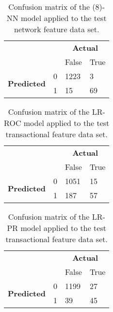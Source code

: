 \begin{table}
\centering
\begin{tabular}{llll}
                                                        &   & \multicolumn{2}{c}{\textbf{Actual}} \\
                                                        &   & False             & True            \\ \hline
\multicolumn{1}{c}{\multirow{2}{*}{\textbf{Predicted}}} & 0 & 1223              & 3               \\
\multicolumn{1}{c}{}                                    & 1 & 15                & 69              \\ \hline
\end{tabular}
\caption{Confusion matrix of the (8)-NN model applied to the test network feature data set.}
\label{tab:ch3_cm_nn_network}
\end{table}

\begin{table}
\centering
\begin{tabular}{llll}
                                                        &   & \multicolumn{2}{c}{\textbf{Actual}} \\
                                                        &   & False             & True            \\ \hline
\multicolumn{1}{c}{\multirow{2}{*}{\textbf{Predicted}}} & 0 & 1051              & 15              \\
\multicolumn{1}{c}{}                                    & 1 & 187               & 57              \\ \hline
\end{tabular}
\caption{Confusion matrix of the LR-ROC model applied to the test transactional feature data set.}
\label{tab:ch3_cm_LR_ROC_trans}
\end{table}

\begin{table}
\centering
\begin{tabular}{llll}
                                                        &   & \multicolumn{2}{c}{\textbf{Actual}} \\
                                                        &   & False             & True            \\ \hline
\multicolumn{1}{c}{\multirow{2}{*}{\textbf{Predicted}}} & 0 & 1199              & 27              \\
\multicolumn{1}{c}{}                                    & 1 & 39                & 45              \\ \hline
\end{tabular}
\caption{Confusion matrix of the LR-PR model applied to the test transactional feature data set.}
\label{tab:ch3_cm_LR_PR_trans}
\end{table}

